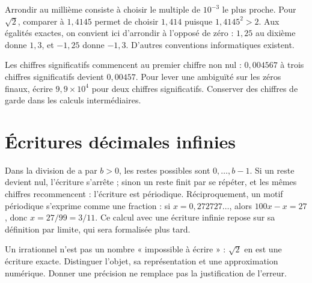 \documentclass[../cours_2de.tex]{subfiles}
\begin{document}
Arrondir au millième consiste à choisir le multiple de $10^{-3}$ le plus proche. Pour $\sqrt2$, comparer à $1{,}4145$ permet de choisir $1{,}414$ puisque $1{,}4145^2>2$. Aux égalités exactes, on convient ici d'arrondir à l'opposé de zéro : $1{,}25$ au dixième donne $1{,}3$, et $-1{,}25$ donne $-1{,}3$. D'autres conventions informatiques existent.
\begin{attention}
Les chiffres significatifs commencent au premier chiffre non nul : $0{,}004567$ à trois chiffres significatifs devient $0{,}00457$. Pour lever une ambiguïté sur les zéros finaux, écrire $9{,}9\times10^4$ pour deux chiffres significatifs. Conserver des chiffres de garde dans les calculs intermédiaires.
\end{attention}
\section{Écritures décimales infinies}
\approfondissement Dans la division de a par $b>0$, les restes possibles sont $0,\ldots,b-1$. Si un reste devient nul, l'écriture s'arrête ; sinon un reste finit par se répéter, et les mêmes chiffres recommencent : l'écriture est périodique. Réciproquement, un motif périodique s'exprime comme une fraction : si $x=0{,}272727\ldots$, alors $100x-x=27$, donc $x=27/99=3/11$. Ce calcul avec une écriture infinie repose sur sa définition par limite, qui sera formalisée plus tard.
\begin{retenir}
Un irrationnel n'est pas un nombre « impossible à écrire » : $\sqrt2$ en est une écriture exacte. Distinguer l'objet, sa représentation et une approximation numérique. Donner une précision ne remplace pas la justification de l'erreur.
\end{retenir}
\end{document}

